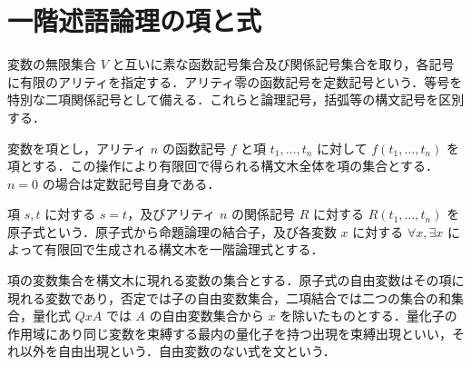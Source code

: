 \section{一階述語論理の項と式}
\begin{defn}[一階言語の記号]
変数の無限集合 $V$ と互いに素な函数記号集合及び関係記号集合を取り，各記号に有限のアリティを指定する．アリティ零の函数記号を定数記号という．等号を特別な二項関係記号として備える．これらと論理記号，括弧等の構文記号を区別する．
\end{defn}
\begin{defn}[項]
変数を項とし，アリティ $n$ の函数記号 $f$ と項 $t_1,\ldots,t_n$ に対して $f(t_1,\ldots,t_n)$ を項とする．この操作により有限回で得られる構文木全体を項の集合とする．$n=0$ の場合は定数記号自身である．
\end{defn}
\begin{defn}[一階論理式]
項 $s,t$ に対する $s=t$，及びアリティ $n$ の関係記号 $R$ に対する $R(t_1,\ldots,t_n)$ を原子式という．原子式から命題論理の結合子，及び各変数 $x$ に対する $\forall x,\exists x$ によって有限回で生成される構文木を一階論理式とする．
\end{defn}
\begin{defn}[自由変数と束縛変数]
項の変数集合を構文木に現れる変数の集合とする．原子式の自由変数はその項に現れる変数であり，否定では子の自由変数集合，二項結合では二つの集合の和集合，量化式 $QxA$ では $A$ の自由変数集合から $x$ を除いたものとする．量化子の作用域にあり同じ変数を束縛する最内の量化子を持つ出現を束縛出現といい，それ以外を自由出現という．自由変数のない式を文という．
\end{defn}
